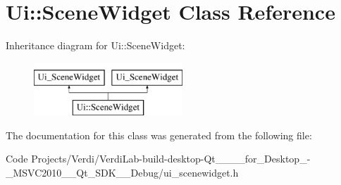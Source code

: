 \hypertarget{class_ui_1_1_scene_widget}{\section{\-Ui\-:\-:\-Scene\-Widget \-Class \-Reference}
\label{class_ui_1_1_scene_widget}
}
\-Inheritance diagram for \-Ui\-:\-:\-Scene\-Widget\-:\begin{figure}[H]
\begin{center}
\leavevmode
\includegraphics[height=2.000000cm]{class_ui_1_1_scene_widget}
\end{center}
\end{figure}


\-The documentation for this class was generated from the following file\-:\begin{DoxyCompactItemize}
\item 
\-Code Projects/\-Verdi/\-Verdi\-Lab-\/build-\/desktop-\/\-Qt\-\_\-\_\-\_\-\_\-for\-\_\-\-Desktop\-\_\--\/\-\_\-\-M\-S\-V\-C2010\-\_\-\-\_\-\-Qt\-\_\-\-S\-D\-K\-\_\-\-\_\-\-Debug/ui\-\_\-scenewidget.\-h\end{DoxyCompactItemize}
